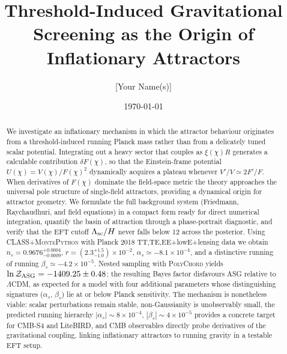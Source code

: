 \documentclass[11pt,a4paper]{article}
\title{Threshold-Induced Gravitational Screening as the Origin of Inflationary Attractors}
\author{[Your Name(s)]}
\date{\today}
\begin{document}
\maketitle

\begin{abstract}
We investigate an inflationary mechanism in which the attractor behaviour originates from a threshold-induced running Planck mass rather than from a delicately tuned scalar potential. Integrating out a heavy sector that couples as $\xi(\chi) R$ generates a calculable contribution $\delta F(\chi)$, so that the Einstein-frame potential $U(\chi)=V(\chi)/F(\chi)^2$ dynamically acquires a plateau whenever $V'/V\simeq2F'/F$. When derivatives of $F(\chi)$ dominate the field-space metric the theory approaches the universal pole structure of single-field attractors, providing a dynamical origin for attractor geometry. We formulate the full background system (Friedmann, Raychaudhuri, and field equations) in a compact form ready for direct numerical integration, quantify the basin of attraction through a phase-portrait diagnostic, and verify that the EFT cutoff $\Lambda_{\rm sc}/H$ never falls below 12 across the posterior. Using \textsc{CLASS}+\textsc{MontePython} with Planck 2018 TT,TE,EE+lowE+lensing data we obtain $n_s=0.9676^{+0.0004}_{-0.0009}$, $r=(2.3^{+1.5}_{-1.0})\times10^{-2}$, $\alpha_s\simeq-8.1\times10^{-4}$, and a distinctive running of running $\beta_s\simeq-4.2\times10^{-5}$. Nested sampling with \textsc{PolyChord} yields $\ln\mathcal{Z}_{\rm ASG}=-1409.25\pm0.48$; the resulting Bayes factor disfavours ASG relative to $\Lambda$CDM, as expected for a model with four additional parameters whose distinguishing signatures ($\alpha_s$, $\beta_s$) lie at or below Planck sensitivity. The mechanism is nonetheless viable: scalar perturbations remain stable, non-Gaussianity is unobservably small, the predicted running hierarchy $|\alpha_s|\sim8\times10^{-4}$, $|\beta_s|\sim4\times10^{-5}$ provides a concrete target for CMB-S4 and LiteBIRD, and CMB observables directly probe derivatives of the gravitational coupling, linking inflationary attractors to running gravity in a testable EFT setup.
\end{abstract}
\end{document}
